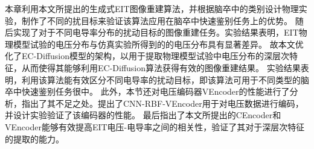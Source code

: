 本章利用本文所提出的生成式EIT图像重建算法，并根据脑卒中的类别设计物理实验，制作了不同的扰目标来验证该算法应用在脑卒中快速鉴别任务上的优势。
随后实现了对于不同电导率分布的扰动目标的图像重建任务。实验结果表明，EIT物理模型试验的电压分布与仿真实验所得到的的电压分布具有显著差异。
故本文优化了EC-Diffusion模型的架构，以用于提取物理模型试验中电压分布的深层次特征，从而使得其能够利用EC-Diffusion算法获得有效的图像重建结果。
实验结果表明，利用该算法能有效区分不同电导率的扰动目标，即该算法可用于不同类型的脑卒中快速鉴别任务很中。
此外，本节还对电压编码器VEncoder的性能进行了分析，指出了其不足之处。提出了CNN-RBF-VEncoder用于对电压数据进行编码，并设计实验验证了该编码器的性能。
最后指出了本文所提出的CEncoder和VEncoder能够有效提高EIT电压-电导率之间的相关性，验证了其对于深层次特征的提取的能力。


